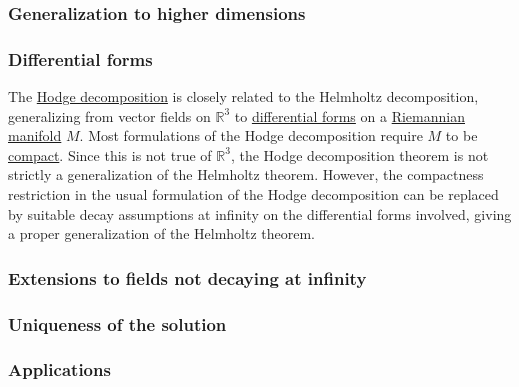 \documentclass{article}
\begin{document}
\subsubsection{Generalization to higher dimensions}

\subsubsection{Differential forms}
The \href{https://en.wikipedia.org/wiki/Hodge_decomposition#Hodge_decomposition}{Hodge decomposition} is closely related to the Helmholtz decomposition, generalizing from vector fields on $\mathbb{R}^3$ to \href{https://en.wikipedia.org/wiki/Differential_forms}{differential forms} on a \href{https://en.wikipedia.org/wiki/Riemannian_manifold}{Riemannian manifold} $M$. Most formulations of the Hodge decomposition require $M$ to be \href{https://en.wikipedia.org/wiki/Compact_space}{compact}. Since this is not true of $\mathbb{R}^3$, the Hodge decomposition theorem is not strictly a generalization of the Helmholtz theorem. However, the compactness restriction in the usual formulation of the Hodge decomposition can be replaced by suitable decay assumptions at infinity on the differential forms involved, giving a proper generalization of the Helmholtz theorem.

\subsubsection{Extensions to fields not decaying at infinity}

\subsubsection{Uniqueness of the solution}

\subsubsection{Applications}
\end{document}

